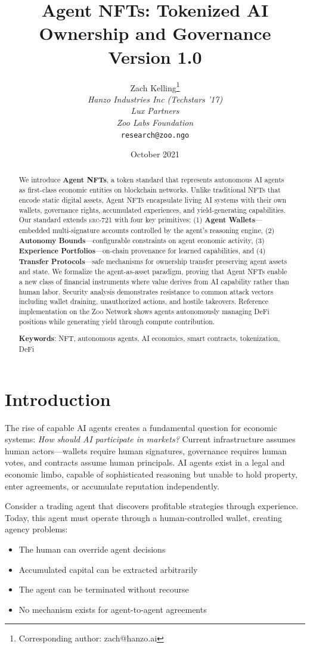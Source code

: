\documentclass[11pt,letterpaper]{article}
\title{\textbf{Agent NFTs: Tokenized AI Ownership and Governance}\\
\large Version 1.0}
\author{
Zach Kelling\thanks{Corresponding author: zach@hanzo.ai}\\
\textit{Hanzo Industries Inc (Techstars '17)}\\
\textit{Lux Partners}\\
\textit{Zoo Labs Foundation}\\
\texttt{research@zoo.ngo}
}
\date{October 2021}
\newcommand{\Zoo}{\textsc{Zoo}}
\newcommand{\ERC}{\textsc{erc}}
\begin{document}
\maketitle
\zoocover

\begin{abstract}
We introduce \textbf{Agent NFTs}, a token standard that represents autonomous AI agents as first-class economic entities on blockchain networks. Unlike traditional NFTs that encode static digital assets, Agent NFTs encapsulate living AI systems with their own wallets, governance rights, accumulated experiences, and yield-generating capabilities. Our standard extends \ERC{}-721 with four key primitives: (1) \textbf{Agent Wallets}---embedded multi-signature accounts controlled by the agent's reasoning engine, (2) \textbf{Autonomy Bounds}---configurable constraints on agent economic activity, (3) \textbf{Experience Portfolios}---on-chain provenance for learned capabilities, and (4) \textbf{Transfer Protocols}---safe mechanisms for ownership transfer preserving agent assets and state. We formalize the agent-as-asset paradigm, proving that Agent NFTs enable a new class of financial instruments where value derives from AI capability rather than human labor. Security analysis demonstrates resistance to common attack vectors including wallet draining, unauthorized actions, and hostile takeovers. Reference implementation on the \Zoo{} Network shows agents autonomously managing DeFi positions while generating yield through compute contribution.

\textbf{Keywords}: NFT, autonomous agents, AI economics, smart contracts, tokenization, DeFi
\end{abstract}

\section{Introduction}

The rise of capable AI agents creates a fundamental question for economic systems: \emph{How should AI participate in markets?} Current infrastructure assumes human actors---wallets require human signatures, governance requires human votes, and contracts assume human principals. AI agents exist in a legal and economic limbo, capable of sophisticated reasoning but unable to hold property, enter agreements, or accumulate reputation independently.

Consider a trading agent that discovers profitable strategies through experience. Today, this agent must operate through a human-controlled wallet, creating agency problems:
\begin{itemize}
    \item The human can override agent decisions
    \item Accumulated capital can be extracted arbitrarily
    \item The agent can be terminated without recourse
    \item No mechanism exists for agent-to-agent agreements
\end{itemize}
\end{document}
